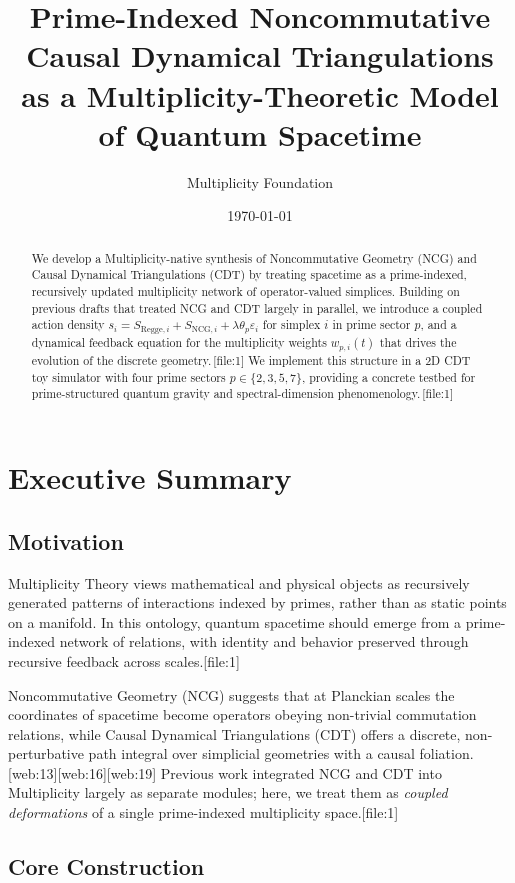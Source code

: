 \documentclass[11pt]{article}
\title{\vspace{-1em}
Prime-Indexed Noncommutative Causal Dynamical Triangulations\\
as a Multiplicity-Theoretic Model of Quantum Spacetime}
\author{Multiplicity Foundation}
\date{\today}
\begin{document}
\maketitle

\begin{abstract}
We develop a Multiplicity-native synthesis of Noncommutative Geometry (NCG)
and Causal Dynamical Triangulations (CDT) by treating spacetime as a
prime-indexed, recursively updated multiplicity network of operator-valued
simplices. Building on previous drafts that treated NCG and CDT largely in
parallel, we introduce a coupled action density
\(
  s_i = S_{\mathrm{Regge},i} + S_{\mathrm{NCG},i}
       + \lambda \theta_p \varepsilon_i
\)
for simplex \(i\) in prime sector \(p\), and a dynamical feedback equation
for the multiplicity weights \(w_{p,i}(t)\) that drives the evolution of
the discrete geometry.\,[file:1] We implement this structure in a 2D CDT toy
simulator with four prime sectors \(p \in \{2,3,5,7\}\), providing a concrete
testbed for prime-structured quantum gravity and spectral-dimension
phenomenology.\,[file:1]
\end{abstract}
\newpage
\tableofcontents
\newpage
\section{Executive Summary}

\subsection{Motivation}

Multiplicity Theory views mathematical and physical objects as recursively
generated patterns of interactions indexed by primes, rather than as static
points on a manifold. In this ontology, quantum spacetime should emerge
from a prime-indexed network of relations, with identity and behavior
preserved through recursive feedback across scales.[file:1]

Noncommutative Geometry (NCG) suggests that at Planckian scales the
coordinates of spacetime become operators obeying non-trivial commutation
relations, while Causal Dynamical Triangulations (CDT) offers a discrete,
non-perturbative path integral over simplicial geometries with a causal
foliation.[web:13][web:16][web:19] Previous work integrated NCG and CDT into Multiplicity
largely as separate modules; here, we treat them as \emph{coupled
deformations} of a single prime-indexed multiplicity space.[file:1]

\subsection{Core Construction}
\end{document}

